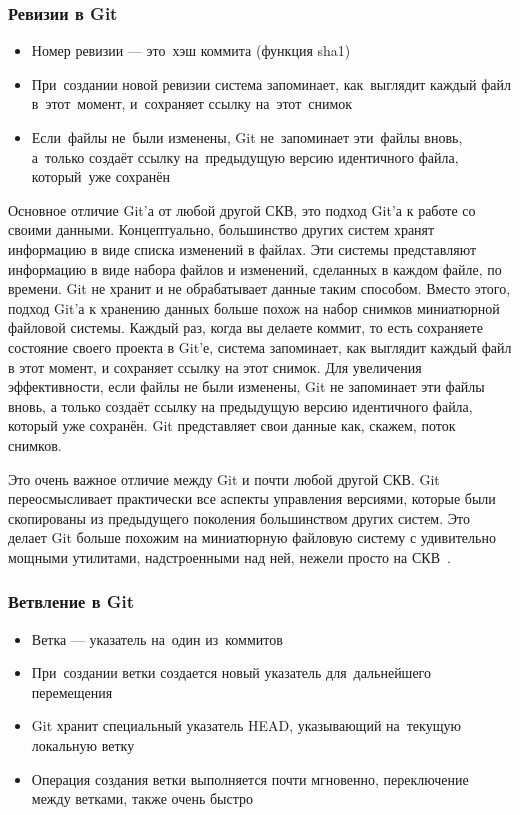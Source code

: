 \documentclass{../industrial-development}
\begin{document}
\begin{frame} \frametitle{Ревизии в Git}
  
  \begin{itemize}
  \item Номер ревизии --- это~хэш коммита (функция sha1)
  \item При~создании новой ревизии система запоминает, как~выглядит каждый файл в~этот~момент, и~сохраняет ссылку на~этот~снимок
  \item Если~файлы не~были изменены, Git не~запоминает эти~файлы вновь, а~только создаёт ссылку на~предыдущую версию идентичного файла, который~уже сохранён
  \end{itemize}
\end{frame}

\lecturenotes

Основное отличие Git’а от любой другой СКВ, это подход Git’а к работе со своими данными. Концептуально, большинство других систем хранят информацию в виде списка изменений в файлах. Эти системы представляют информацию в виде набора файлов и изменений, сделанных в каждом файле, по времени. 
Git не хранит и не обрабатывает данные таким способом. Вместо этого, подход Git’а к хранению данных больше похож на набор снимков миниатюрной файловой системы. Каждый раз, когда вы делаете коммит, то есть сохраняете состояние своего проекта в Git’е, система запоминает, как выглядит каждый файл в этот момент, и сохраняет ссылку на этот снимок. Для увеличения эффективности, если файлы не были изменены, Git не запоминает эти файлы вновь, а только создаёт ссылку на предыдущую версию идентичного файла, который уже сохранён. Git представляет свои данные как, скажем, поток снимков.

Это очень важное отличие между Git и почти любой другой СКВ. Git переосмысливает практически все аспекты управления версиями, которые были скопированы из предыдущего поколения большинством других систем. Это делает Git больше похожим на миниатюрную файловую систему с удивительно мощными утилитами, надстроенными над ней, нежели просто на СКВ~\cite[с.~8]{ProGit}.

\begin{frame} \frametitle{Ветвление в Git}
  
  \begin{itemize}
  \item Ветка --- указатель на~один из~коммитов
  \item При~создании ветки создается новый указатель для~дальнейшего перемещения
  \item Git хранит специальный указатель HEAD, указывающий на~текущую локальную ветку
  \item Операция создания ветки выполняется почти мгновенно, переключение между ветками, также очень быстро
  \end{itemize}
\end{frame}
\end{document}
